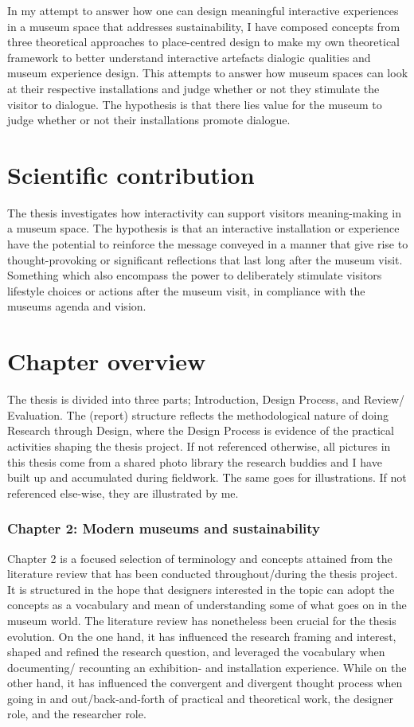 In my attempt to answer how one can design meaningful interactive experiences in a museum space that addresses sustainability, I have composed concepts from three theoretical approaches to place-centred design to make my own theoretical framework to better understand interactive artefacts dialogic qualities and museum experience design. This attempts to answer how museum spaces can look at their respective installations and judge whether or not they stimulate the visitor to dialogue. The hypothesis is that there lies value for the museum to judge whether or not their installations promote dialogue.

\section{Scientific contribution}
The thesis investigates how interactivity can support visitors meaning-making in a museum space. The hypothesis is that an interactive installation or experience have the potential to reinforce the message conveyed in a manner that give rise to thought-provoking or significant reflections that last long after the museum visit. Something which also encompass the power to deliberately stimulate visitors lifestyle choices or actions after the museum visit, in compliance with the museums agenda and vision. 


\section{Chapter overview}
The thesis is divided into three parts; Introduction, Design Process, and Review/ Evaluation. The (report) structure reflects the methodological nature of doing Research through Design, where the Design Process is evidence of the practical activities shaping the thesis project. If not referenced otherwise, all pictures in this thesis come from a shared photo library the research buddies and I have built up and accumulated during fieldwork. The same goes for illustrations. If not referenced else-wise, they are illustrated by me.

\subsubsection{Chapter 2: Modern museums and sustainability}
Chapter 2 is a focused selection of terminology and concepts attained from the literature review that has been conducted throughout/during the thesis project. It is structured in the hope that designers interested in the topic can adopt the concepts as a vocabulary and mean of understanding some of what goes on in the museum world. The literature review has nonetheless been crucial for the thesis evolution. On the one hand, it has influenced the research framing and interest, shaped and refined the research question, and leveraged the vocabulary when documenting/ recounting an exhibition- and installation experience. While on the other hand, it has influenced the convergent and divergent thought process when going in and out/back-and-forth of practical and theoretical work, the designer role, and the researcher role.

